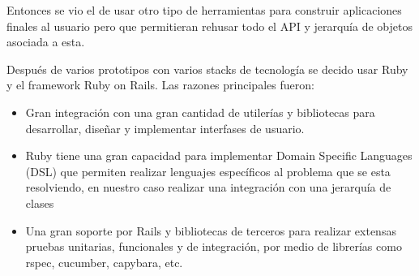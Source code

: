 \documentclass{article}
\begin{document}
Entonces se vio el de usar otro tipo de herramientas para construir
aplicaciones finales al usuario pero que permitieran rehusar todo el API
y jerarquía de objetos asociada a esta.

Después de varios prototipos con varios stacks de tecnología se decido
usar Ruby y el framework Ruby on Rails.
Las razones principales fueron:
\begin{itemize}
\item Gran integración con una gran cantidad de utilerías y bibliotecas para
  desarrollar, diseñar y implementar interfases de usuario.
\item Ruby tiene una gran capacidad para implementar Domain Specific Languages (DSL)
  que permiten realizar lenguajes específicos al problema que se esta resolviendo,
  en nuestro caso realizar una integración con una jerarquía de clases
\item Una gran soporte por Rails y bibliotecas de terceros para
  realizar extensas pruebas unitarias, funcionales y de integración,
  por medio de librerías como rspec, cucumber, capybara, etc.
\end{itemize}
\end{document}
